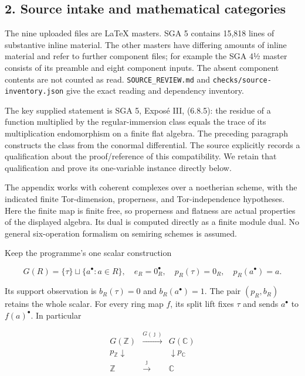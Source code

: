 \subsection{2. Source intake and mathematical categories}\label{endpoint-sga_trace_period--source-intake-and-mathematical-categories}

The nine uploaded files are LaTeX masters. SGA 5 contains 15,818 lines of substantive inline material. The other masters have differing amounts of inline material and refer to further component files; for example the SGA 4½ master consists of its preamble and eight component inputs. The absent component contents are not counted as read. \nolinkurl{SOURCE_REVIEW.md} and \nolinkurl{checks/source-inventory.json} give the exact reading and dependency inventory.

The key supplied statement is SGA 5, Exposé III, (6.8.5): the residue of a function multiplied by the regular-immersion class equals the trace of its multiplication endomorphism on a finite flat algebra. The preceding paragraph constructs the class from the conormal differential. The source explicitly records a qualification about the proof/reference of this compatibility. We retain that qualification and prove its one-variable instance directly below.

The appendix works with coherent complexes over a noetherian scheme, with the indicated finite Tor-dimension, properness, and Tor-independence hypotheses. Here the finite map is finite free, so properness and flatness are actual properties of the displayed algebra. Its dual is computed directly as a finite module dual. No general six-operation formalism on semiring schemes is assumed.

Keep the programme's one scalar construction

\[
G(R)=\{\tau\}\sqcup\{a^\bullet:a\in R\},
\quad e_R=0_R^\bullet,
\quad p_R(\tau)=0_R,\quad p_R(a^\bullet)=a.
\tag{3}
\]

Its support observation is \(b_R(\tau)=0\) and \(b_R(a^\bullet)=1\). The pair \((p_R,b_R)\) retains the whole scalar. For every ring map \(f\), its split lift fixes \(\tau\) and sends \(a^\bullet\) to \(f(a)^\bullet\). In particular

\[
\begin{array}{ccc}
G(\mathbb Z)&\xrightarrow{G(\jmath)}&G(\mathbb C)\\
p_{\mathbb Z}\downarrow&&\downarrow p_{\mathbb C}\\
\mathbb Z&\xrightarrow{\jmath}&\mathbb C
\end{array}
\tag{4}
\]


